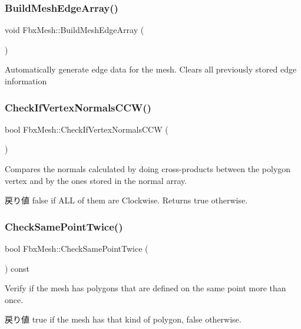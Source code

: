\subsubsection{\texorpdfstring{Build\+Mesh\+Edge\+Array()}{BuildMeshEdgeArray()}}
{\footnotesize\ttfamily void Fbx\+Mesh\+::\+Build\+Mesh\+Edge\+Array (\begin{DoxyParamCaption}{ }\end{DoxyParamCaption})}

Automatically generate edge data for the mesh. Clears all previously stored edge information \mbox{\label{class_fbx_mesh_ae78fd7bf1ee7986774560ed29915189a}} 
\subsubsection{\texorpdfstring{Check\+If\+Vertex\+Normals\+C\+C\+W()}{CheckIfVertexNormalsCCW()}}
{\footnotesize\ttfamily bool Fbx\+Mesh\+::\+Check\+If\+Vertex\+Normals\+C\+CW (\begin{DoxyParamCaption}{ }\end{DoxyParamCaption})}

Compares the normals calculated by doing cross-\/products between the polygon vertex and by the ones stored in the normal array. \begin{DoxyReturn}{戻り値}
{\ttfamily false} if A\+LL of them are Clockwise. Returns {\ttfamily true} otherwise. 
\end{DoxyReturn}
\mbox{\label{class_fbx_mesh_a4f49af18c3d12d2436b0547a10ebc262}} 
\subsubsection{\texorpdfstring{Check\+Same\+Point\+Twice()}{CheckSamePointTwice()}}
{\footnotesize\ttfamily bool Fbx\+Mesh\+::\+Check\+Same\+Point\+Twice (\begin{DoxyParamCaption}{ }\end{DoxyParamCaption}) const}

Verify if the mesh has polygons that are defined on the same point more than once. \begin{DoxyReturn}{戻り値}
true if the mesh has that kind of polygon, false otherwise. 
\end{DoxyReturn}
\mbox{\label{class_fbx_mesh_a05ca6a8fbd028777c91931ce6edf4b19}} 
